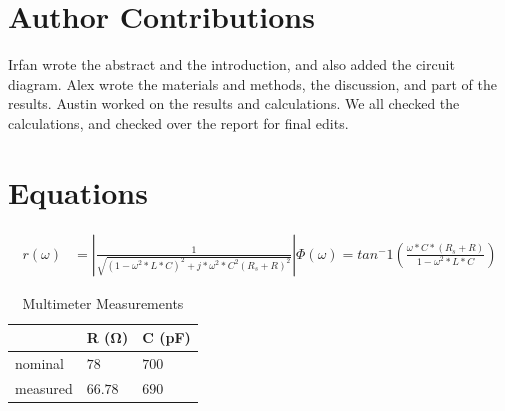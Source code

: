 \documentclass[10pt,twocolumn]{article}
\begin{document}
\section{Author Contributions}

Irfan wrote the abstract and the introduction, and also added the circuit diagram. Alex wrote the materials and methods, the discussion, and part of the results. Austin worked on the results and calculations. We all checked the calculations, and checked over the report for final edits.

\section{Equations}


\begin{align*}
	
	 r(\omega) &= |\frac{1}{\sqrt{\left(1 - \omega^2*L*C\right)^2 + j*\omega^2*C^2\left(R_{s}+R\right)^2}}|
	 
	 \Phi(\omega) = tan^-1(\frac{\omega*C*\left(R_{s}+R\right)}{1-\omega^2*L*C})
\end{align*}

\begin{table}[bt]
	\begin{tabularx}{1\linewidth}{ lXX }
		\hline
		 & \textbf{R (Ω)} & \textbf{C (pF)} \\
		\hline
		nominal & $78$ & $700$ \\
		measured & $66.78$ & $690$ \\
		\hline
	\end{tabularx}
	\caption{Multimeter Measurements}
	\label{tab:Tab1}
\end{table}
\end{document}
